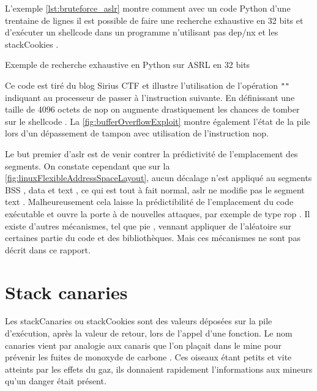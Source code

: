 L'exemple \autoref{lst:bruteforce_aslr} montre comment avec un code Python d'une trentaine de lignes il est possible de faire une recherche exhaustive en 32 bits et d'exécuter un \og shellcode \fg dans un programme n'utilisant pas \gls{dep}/\gls{nx} et les \og \gls{stackCookies} \fg.

\begin{listing}
	\caption{Exemple de recherche exhaustive en Python sur ASRL en 32 bits}
	\label{lst:bruteforce_aslr}
\end{listing}

Ce code est tiré du blog \og Sirius CTF \fg \cite{ExploitingSimpleBufferOverflow} et illustre l'utilisation de l'opération \texttt{""} indiquant au processeur de passer à l'instruction suivante. En définissant une taille de 4096 octets de \og \gls{nop} \fg on augmente drastiquement les chances de tomber sur le \og shellcode \fg. La \autoref{fig:bufferOverflowExploit} montre également l'état de la pile lors d'un dépassement de tampon avec utilisation de l'instruction \gls{nop}.

Le but premier d'\gls{aslr} est de venir contrer la prédictivité de l'emplacement des segments. On constate cependant que sur la \autoref{fig:linuxFlexibleAddressSpaceLayout}, aucun décalage n'est appliqué au segments \og BSS \fg, \og data \fg et \og text \fg, ce qui est tout à fait normal, \gls{aslr} ne modifie pas le segment \og text \fg. Malheureusement cela laisse la prédictibilité de l'emplacement du code exécutable et ouvre la porte à de nouvelles attaques, par exemple de type \og \gls{rop} \fg. Il existe d'autres mécanismes, tel que \og \gls{pie} \fg \cite{PositionIndependentExecutables}, vennant appliquer de l'aléatoire sur certaines partie du code et des bibliothèques. Mais ces mécanismes ne sont pas décrit dans ce rapport.

\vfill

\section{\og Stack canaries \fg}

Les \og \gls{stackCanaries} \fg ou \og \gls{stackCookies} \fg sont des valeurs déposées sur la pile d'exécution, après la valeur de retour, lors de l'appel d'une fonction. Le nom \og canaries \fg vient par analogie aux canaris que l'on plaçait dans le mine pour prévenir les fuites de monoxyde de carbone \cite{StackCanaries, SentinelSpecies}. Ces oiseaux étant petits et vite atteints par les effets du gaz, ils donnaient rapidement l'informations aux mineurs qu'un danger était présent.

